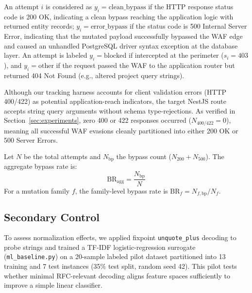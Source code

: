 An attempt $i$ is considered as $y_i=\mathrm{clean\_bypass}$ if the HTTP response status code is 200 OK, indicating a clean bypass reaching the application logic with returned entity records; $y_i=\mathrm{error\_bypass}$ if the status code is 500 Internal Server Error, indicating that the mutated payload successfully bypassed the WAF edge and caused an unhandled PostgreSQL driver syntax exception at the database layer. An attempt is labeled $y_i=\mathrm{blocked}$ if intercepted at the perimeter ($s_i = 403$), and $y_i=\mathrm{other}$ if the request passed the WAF to the application router but returned 404 Not Found (e.g., altered project query strings).

Although our tracking harness accounts for client validation errors (HTTP 400/422) as potential application-reach indicators, the target NestJS route accepts string query arguments without schema type-rejections. As verified in Section~\ref{sec:experiments}, zero 400 or 422 responses occurred ($N_{400/422}=0$), meaning all successful WAF evasions cleanly partitioned into either 200 OK or 500 Server Errors.

Let $N$ be the total attempts and $N_{\mathrm{bp}}$ the bypass count ($N_{200} + N_{500}$). The aggregate bypass rate is:
\begin{equation}
\label{eq:aggregate-bypass-rate}
\mathrm{BR}_{\mathrm{agg}} = \frac{N_{\mathrm{bp}}}{N}
\end{equation}
For a mutation family $f$, the family-level bypass rate is $\mathrm{BR}_f = N_{f,\mathrm{bp}}/N_f$.

\subsection{Secondary Control}
To assess normalization effects, we applied fixpoint \texttt{unquote\_plus} decoding to probe strings and trained a TF-IDF logistic-regression surrogate (\texttt{ml\_baseline.py}) on a 20-sample labeled pilot dataset partitioned into 13 training and 7 test instances (35\% test split, random seed 42). This pilot tests whether minimal RFC-relevant decoding aligns feature spaces sufficiently to improve a simple linear classifier.

